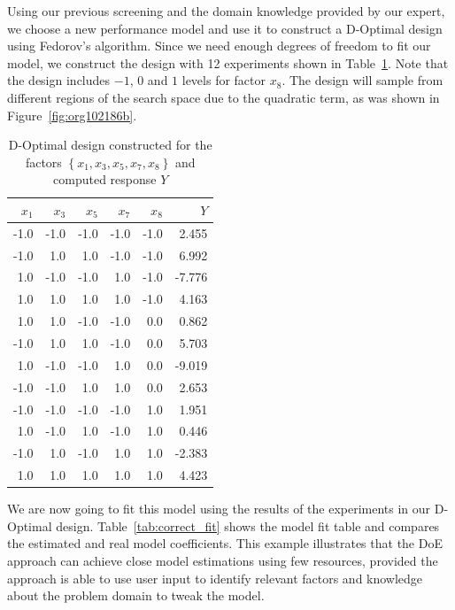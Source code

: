 \documentclass[conference]{IEEEtran}
\begin{document}
Using our previous screening and the domain knowledge provided by our expert, we
choose a new performance model and use it to construct a D-Optimal design using
Fedorov's algorithm. Since we need enough degrees of freedom to fit our model,
we construct the design with 12 experiments shown in Table~\ref{tab:d_optimal}.
Note that the design includes \(-1\), \(0\) and \(1\) levels for factor \(x_8\). The design
will sample from different regions of the search space due to the quadratic term,
as was shown in Figure~\ref{fig:org102186b}.

\begin{table}[t]
\centering
\caption{D-Optimal design constructed for the factors $\left\{x_1,x_3,x_5,x_7,x_8\right\}$ and computed response $Y$}
\label{tab:d_optimal}
\begingroup\footnotesize
\begin{tabular}{rrrrrr}
  \toprule
$x_1$ & $x_3$ & $x_5$ & $x_7$ & $x_8$ & $Y$ \\
  \midrule
-1.0 & -1.0 & -1.0 & -1.0 & -1.0 & 2.455 \\
  -1.0 & 1.0 & 1.0 & -1.0 & -1.0 & 6.992 \\
  1.0 & -1.0 & -1.0 & 1.0 & -1.0 & -7.776 \\
  1.0 & 1.0 & 1.0 & 1.0 & -1.0 & 4.163 \\
  1.0 & 1.0 & -1.0 & -1.0 & 0.0 & 0.862 \\
  -1.0 & 1.0 & 1.0 & -1.0 & 0.0 & 5.703 \\
  1.0 & -1.0 & -1.0 & 1.0 & 0.0 & -9.019 \\
  -1.0 & -1.0 & 1.0 & 1.0 & 0.0 & 2.653 \\
  -1.0 & -1.0 & -1.0 & -1.0 & 1.0 & 1.951 \\
  1.0 & -1.0 & 1.0 & -1.0 & 1.0 & 0.446 \\
  -1.0 & 1.0 & -1.0 & 1.0 & 1.0 & -2.383 \\
  1.0 & 1.0 & 1.0 & 1.0 & 1.0 & 4.423 \\
   \bottomrule
\end{tabular}
\endgroup
\end{table}

We are now going to fit this model using the results of the experiments in our
D-Optimal design. Table~\ref{tab:correct_fit} shows the model fit table
and compares the estimated and real model coefficients. This example illustrates
that the DoE approach can achieve close model estimations
using few resources, provided the approach is able to use user input to identify
relevant factors and knowledge about the problem domain to tweak the model.
\end{document}
